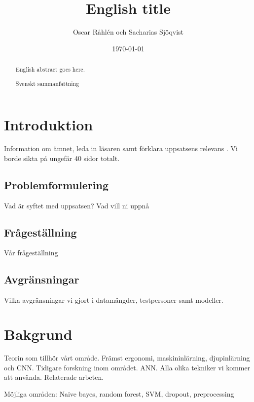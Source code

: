 \documentclass{kththesis}
\title{English title}
\author{Oscar Råhlén och Sacharias Sjöqvist}
\date{\today}
\begin{document}
\frontmatter

\titlepage

\begin{abstract}
  English abstract goes here.
\end{abstract}

\begin{otherlanguage}{swedish}
  \begin{abstract}
    Svenskt sammanfattning
  \end{abstract}
\end{otherlanguage}

\tableofcontents

\mainmatter


\chapter{Introduktion}
Information om ämnet, leda in läsaren samt förklara uppsatsens relevans \parencite{heisenberg2015}. 
Vi borde sikta på ungefär 40 sidor totalt.

  \section{Problemformulering}
  Vad är syftet med uppsatsen? Vad vill ni uppnå

  \section{Frågeställning}
  Vår frågeställning

  \section{Avgränsningar}
  Vilka avgränsningar vi gjort i datamängder, testpersoner samt modeller.

\chapter{Bakgrund}
Teorin som tillhör vårt område. Främst ergonomi, maskininlärning, djupinlärning och CNN. Tidigare forskning inom området. ANN. 
Alla olika tekniker vi kommer att använda. Relaterade arbeten. 

Möjliga områden: Naive bayes, random forest, SVM, dropout, preprocessing
\end{document}
